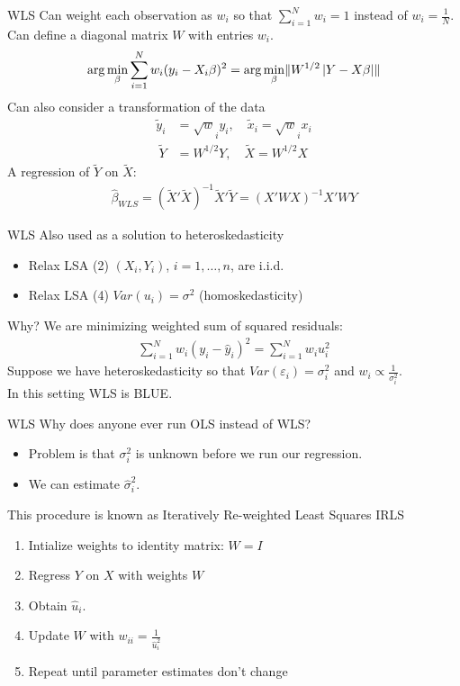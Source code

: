 \documentclass[aspectratio=169,11pt]{beamer}
\begin{document}
\begin{frame}{WLS}
Can weight each observation as $w_i$ so that $\sum_{i=1}^N w_i = 1$ instead of $w_i=\frac{1}{N}$.\\
Can define a diagonal matrix $W$ with entries $w_i$.
\begin{align*}
\arg \min_{\beta} \sum_{i=1}^N w_i (y_i - X_i \beta)^2 = \arg \min_{\beta} \lVert W^{1/2} \left|Y - X \beta \right| \rVert 
\end{align*}
Can also consider a transformation of the data 
\begin{align*}
\tilde{y}_i &= \sqrt{w}_i y_i , \quad  \tilde{x}_i = \sqrt{w}_i x_i \\\
\tilde{Y} &= W^{1/2} Y, \quad  \tilde{X} = W^{1/2} X
\end{align*}
A regression of $\tilde{Y}$ on $\tilde{X}$:
\begin{align*}
\widehat{\beta}_{WLS} = (\tilde{X}'\tilde{X})^{-1}\tilde{X}'\tilde{Y} = (X' W X)^{-1} X' W Y
\end{align*}
\end{frame}

\begin{frame}{WLS}
Also used as a solution to heteroskedasticity
\begin{itemize}
    \item Relax LSA (2) $(X_i,Y_i)$, $i =1,\ldots,n$, are i.i.d.
    \item Relax LSA (4) $Var(u_i) = \sigma^2$ (homoskedasticity)
\end{itemize}
Why? We are minimizing weighted sum of squared residuals:
\begin{align*}
\sum_{i=1}^N w_i (y_i - \hat{y}_i)^2 = \sum_{i=1}^N w_i u_i^2 
\end{align*}
Suppose we have heteroskedasticity so that $Var(\varepsilon_i) = \sigma_i^2$ and $w_i \propto \frac{1}{\sigma_i^2}$.\\
In this setting WLS is \alert{BLUE}.
\end{frame}

\begin{frame}{WLS}
Why does anyone ever run OLS instead of WLS?
\begin{itemize}
\item Problem is that $\sigma_i^2$ is unknown before we run our regression.
\item We can estimate $\widehat{\sigma}_i^2$.
\end{itemize}
This procedure is known as Iteratively Re-weighted Least Squares \alert{IRLS}
\begin{enumerate}
\item Intialize weights to identity matrix: $W = I$
\item Regress $Y$ on $X$ with weights $W$
\item Obtain $\widehat{u}_i$.
\item Update $W$ with $w_{ii} = \frac{1}{\widehat{u}_i^2}$
\item Repeat until parameter estimates don't change
\end{enumerate}
\end{frame}
\end{document}
